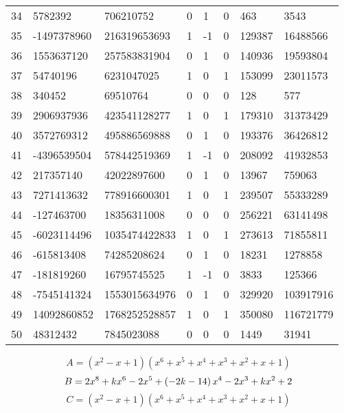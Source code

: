 \documentclass{amsart}
\begin{document}
\begin{longtable}{|l|l|l|lllll|}
34&5782392&706210752&0&1&0&463&3543\\
35&-1497378960&216319653693&1&-1&0&129387&16488566\\
36&1553637120&257583831904&0&1&0&140936&19593804\\
37&54740196&6231047025&1&0&1&153099&23011573\\
38&340452&69510764&0&0&0&128&577\\
39&2906937936&423541128277&1&0&1&179310&31373429\\
40&3572769312&495886569888&0&1&0&193376&36426812\\
41&-4396539504&578442519369&1&-1&0&208092&41932853\\
42&217357140&42022897600&0&1&0&13967&759063\\
43&7271413632&778916600301&1&0&1&239507&55333289\\
44&-127463700&18356311008&0&0&0&256221&63141498\\
45&-6023114496&1035474422833&1&0&1&273613&71855811\\
46&-615813408&74285208624&0&1&0&18231&1278858\\
47&-181819260&16795745525&1&-1&0&3833&125366\\
48&-7545141324&1553015634976&0&1&0&329920&103917916\\
49&14092860852&1768252528857&1&0&1&350080&116721779\\
50&48312432&7845023088&0&0&0&1449&31941\\
\hline
\end{longtable}
$$A=(x^2
 - x
 + 1)(x^6
 + x^5
 + x^4
 + x^3
 + x^2
 + x
 + 1)$$
$$B=2\*x^8
 + k\*x^6
 - 2\*x^5
 + \left(-2\*k
 - 14\right) \*x^4
 - 2\*x^3
 + k\*x^2
 + 2$$
$$C=(x^2
 - x
 + 1)(x^6
 + x^5
 + x^4
 + x^3
 + x^2
 + x
 + 1)$$
\end{document}
